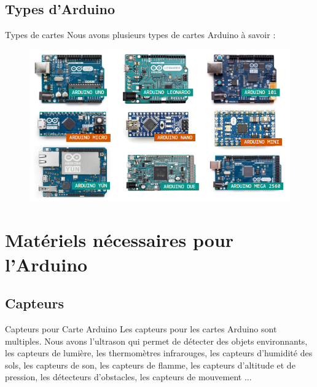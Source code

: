 \documentclass[]{beamer}
\begin{document}
	\subsection{Types d'Arduino}
	\begin{frame}
	{Types de cartes}
	Nous avons plusieurs types de cartes Arduino à savoir :
	\begin{figure}
	\begin{center}
	 \includegraphics[scale=0.5]{types-arduino.png}
	\end{center}
	\end{figure}
	\end{frame}
	\section{Matériels nécessaires pour l'Arduino}
	\subsection{Capteurs}
	\begin{frame}
	{Capteurs pour Carte Arduino}
	 Les capteurs pour les cartes Arduino sont multiples.
	Nous avons l'ultrason qui permet de détecter des objets environnants, les capteurs de lumière, les thermomètres infrarouges, les capteurs d'humidité des sols, les capteurs de son, les capteurs de flamme, les capteurs d'altitude et de pression, les détecteurs d'obstacles, les capteurs de mouvement ...
	\end{frame}
\end{document}
